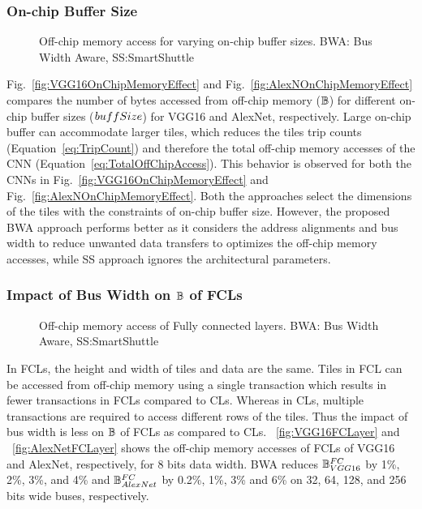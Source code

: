 \subsubsection{On-chip Buffer Size}
\begin{figure}[htb]
	\centering
	\hfil
	\hfil
	\caption{Off-chip memory access for varying on-chip buffer sizes. BWA: Bus Width Aware, SS:SmartShuttle}
	\label{fig:EffectOfVaryingOnChipBuffer}
	\vspace{-1.0em}
\end{figure}
Fig.~\ref{fig:VGG16OnChipMemoryEffect} and Fig.~\ref{fig:AlexNOnChipMemoryEffect} compares the number of bytes accessed from off-chip memory ($\mathbb{B}$) for different on-chip buffer sizes ($buffSize$) for VGG16 and AlexNet, respectively. Large on-chip buffer can accommodate larger tiles, which reduces the tiles trip counts (Equation~\ref{eq:TripCount}) and therefore the total off-chip memory accesses of the CNN (Equation~\ref{eq:TotalOffChipAccess}). This behavior is observed for both the CNNs in Fig.~\ref{fig:VGG16OnChipMemoryEffect} and Fig.~\ref{fig:AlexNOnChipMemoryEffect}. Both the approaches select the dimensions of the tiles  with the constraints of on-chip buffer size. However, the proposed BWA approach performs better as it considers the address alignments and bus width to reduce unwanted data transfers to optimizes the off-chip memory accesses, while SS approach ignores the architectural parameters.
\subsubsection{Impact of Bus Width on $\mathbb{B}$ of FCLs}
\begin{figure}[htb]
	\centering
	\hfil
	\hfil	
	\caption{Off-chip memory access of Fully connected layers. BWA: Bus Width Aware, SS:SmartShuttle}
	\label{fig:EffectOnFC}
	\vspace{-1.0em}
\end{figure}
In FCLs, the height and width of tiles and data are the same. Tiles in FCL can be accessed from off-chip memory using a single transaction which results in fewer transactions in FCLs compared to CLs. Whereas in CLs, multiple transactions are required to access different rows of the tiles. Thus the impact of bus width is less on $\mathbb{B}$ of FCLs as compared to CLs. \figurename~\ref{fig:VGG16FCLayer} and \figurename~\ref{fig:AlexNetFCLayer} shows the off-chip memory accesses of FCLs of VGG16 and AlexNet, respectively, for 8 bits data width. BWA reduces $\mathbb{B}_{VGG16}^{FC}$ by 1\%, 2\%, 3\%, and 4\% and $\mathbb{B}_{AlexNet}^{FC}$ by 0.2\%, 1\%, 3\% and 6\% on 32, 64, 128, and 256 bits wide buses, respectively.
